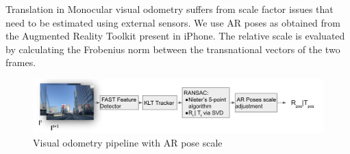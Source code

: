 \documentclass[conference]{IEEEtran}
\begin{document}


Translation in Monocular visual odometry suffers from scale factor issues that need to be estimated using external sensors. We use AR poses as obtained from the Augmented Reality Toolkit present in iPhone. The relative scale is evaluated by calculating the Frobenius norm between the transnational vectors of the two frames.

\begin{figure}[htb]
\centerline{\includegraphics[scale=0.3]{Images/vo_pipeline.png}}
\caption{Visual odometry pipeline with AR pose scale}
\label{3d_points}
\end{figure}
\end{document}
